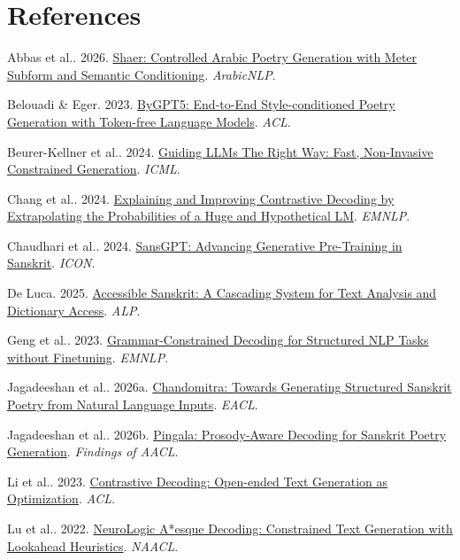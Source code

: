 \section*{References}
\begin{list}{}{\setlength{\leftmargin}{1em}\setlength{\itemindent}{-1em}\setlength{\itemsep}{4pt}}
\item Abbas et al.. 2026. \href{https://aclanthology.org/2026.arabicnlp-main.14/}{Shaer: Controlled Arabic Poetry Generation with Meter Subform and Semantic Conditioning}. \textit{ArabicNLP}.
\item Belouadi \& Eger. 2023. \href{https://aclanthology.org/2023.acl-long.406/}{ByGPT5: End-to-End Style-conditioned Poetry Generation with Token-free Language Models}. \textit{ACL}.
\item Beurer-Kellner et al.. 2024. \href{https://proceedings.mlr.press/v235/beurer-kellner24a.html}{Guiding LLMs The Right Way: Fast, Non-Invasive Constrained Generation}. \textit{ICML}.
\item Chang et al.. 2024. \href{https://aclanthology.org/2024.emnlp-main.484/}{Explaining and Improving Contrastive Decoding by Extrapolating the Probabilities of a Huge and Hypothetical LM}. \textit{EMNLP}.
\item Chaudhari et al.. 2024. \href{https://aclanthology.org/2024.icon-1.50/}{SansGPT: Advancing Generative Pre-Training in Sanskrit}. \textit{ICON}.
\item De Luca. 2025. \href{https://aclanthology.org/2025.alp-1.5/}{Accessible Sanskrit: A Cascading System for Text Analysis and Dictionary Access}. \textit{ALP}.
\item Geng et al.. 2023. \href{https://aclanthology.org/2023.emnlp-main.674/}{Grammar-Constrained Decoding for Structured NLP Tasks without Finetuning}. \textit{EMNLP}.
\item Jagadeeshan et al.. 2026a. \href{https://aclanthology.org/2026.eacl-long.24/}{Chandomitra: Towards Generating Structured Sanskrit Poetry from Natural Language Inputs}. \textit{EACL}.
\item Jagadeeshan et al.. 2026b. \href{https://aclanthology.org/2026.findings-aacl.132/}{Pingala: Prosody-Aware Decoding for Sanskrit Poetry Generation}. \textit{Findings of AACL}.
\item Li et al.. 2023. \href{https://aclanthology.org/2023.acl-long.687/}{Contrastive Decoding: Open-ended Text Generation as Optimization}. \textit{ACL}.
\item Lu et al.. 2022. \href{https://aclanthology.org/2022.naacl-main.57/}{NeuroLogic A*esque Decoding: Constrained Text Generation with Lookahead Heuristics}. \textit{NAACL}.

\end{list}
